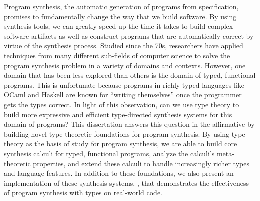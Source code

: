 Program synthesis, the automatic generation of programs from specification, promises to fundamentally change the way that we build software.
By using synthesis tools, we can greatly speed up the time it takes to build complex software artifacts as well as construct programs that are automatically correct by virtue of the synthesis process.
Studied since the 70s, researchers have applied techniques from many different sub-fields of computer science to solve the program synthesis problem in a variety of domains and contexts.
However, one domain that has been less explored than others is the domain of typed, functional programs.
This is unfortunate because programs in richly-typed languages like OCaml and Haskell are known for ``writing themselves'' once the programmer gets the types correct.
In light of this observation, can we use type theory to build more expressive and efficient type-directed synthesis systems for this domain of programs?
This dissertation answers this question in the affirmative by building novel type-theoretic foundations for program synthesis.
By using type theory as the basis of study for program synthesis, we are able to build core synthesis calculi for typed, functional programs, analyze the calculi's meta-theoretic properties, and extend these calculi to handle increasingly richer types and language features.
In addition to these foundations, we also present an implementation of these synthesis systems, \myth{}, that demonstrates the effectiveness of program synthesis with types on real-world code.
